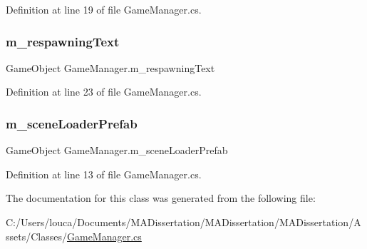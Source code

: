 Definition at line 19 of file Game\+Manager.\+cs.

\mbox{\label{class_game_manager_a0fed6d237d49a6a342b35a4423e6c03d}} 
\subsubsection{\texorpdfstring{m\+\_\+respawning\+Text}{m\_respawningText}}
{\footnotesize\ttfamily Game\+Object Game\+Manager.\+m\+\_\+respawning\+Text\hspace{0.3cm}{\ttfamily [private]}}



Definition at line 23 of file Game\+Manager.\+cs.

\mbox{\label{class_game_manager_afe830d016f2ae2f5b74e792bcd957cb4}} 
\subsubsection{\texorpdfstring{m\+\_\+scene\+Loader\+Prefab}{m\_sceneLoaderPrefab}}
{\footnotesize\ttfamily Game\+Object Game\+Manager.\+m\+\_\+scene\+Loader\+Prefab\hspace{0.3cm}{\ttfamily [private]}}



Definition at line 13 of file Game\+Manager.\+cs.



The documentation for this class was generated from the following file\+:\begin{DoxyCompactItemize}
\item 
C\+:/\+Users/louca/\+Documents/\+M\+A\+Dissertation/\+M\+A\+Dissertation/\+M\+A\+Dissertation/\+Assets/\+Classes/\mbox{\hyperlink{_game_manager_8cs}{Game\+Manager.\+cs}}\end{DoxyCompactItemize}
